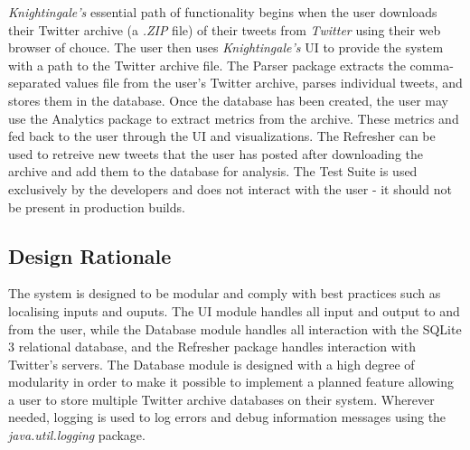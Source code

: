 \documentclass[a4paper, 12pt]{article}
\begin{document}
\begin{adjustwidth}{2em}{0pt}
\noindent \textit{Knightingale's} essential path of functionality begins when the user downloads their Twitter archive (a \textit{.ZIP} file) of their tweets from \textit{Twitter} using their web browser of chouce. The user then uses \textit{Knightingale's} UI to provide the system with a path to the Twitter archive file. The Parser package extracts the comma-separated values file from the user's Twitter archive, parses individual tweets, and stores them in the database. Once the database has been created, the user may use the Analytics package to extract metrics from the archive. These metrics and fed back to the user through the UI and visualizations. The Refresher can be used to retreive new tweets that the user has posted after downloading the archive and add them to the database for analysis. The Test Suite is used exclusively by the developers and does not interact with the user - it should not be present in production builds.
\end{adjustwidth}

\subsection{Design Rationale} \label{sec:rationale}
\begin{adjustwidth}{2em}{0pt}
The system is designed to be modular and comply with best practices such as localising inputs and ouputs. The UI module handles all input and output to and from the user, while the Database module handles all interaction with the SQLite 3 relational database, and the Refresher package handles interaction with Twitter's servers. The Database module is designed with a high degree of modularity in order to make it possible to implement a planned feature allowing a user to store multiple Twitter archive databases on their system. Wherever needed, logging is used to log errors and debug information messages using the \textit{java.util.logging} package. 
\end{adjustwidth}
\end{document}
